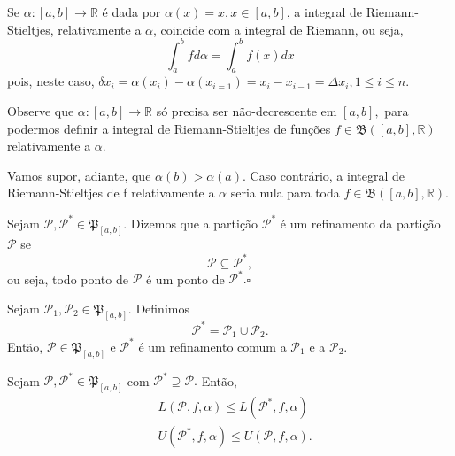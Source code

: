 \documentclass[Analysis/analysis_notes.tex]{subfiles}
\begin{document}
 Se \(\alpha :[a, b]\rightarrow \mathbb{R}\) é dada por \(\alpha (x) = x, x\in[a, b]\), a integral de Riemann-Stieltjes, relativamente a \(\alpha \), coincide
com a integral de Riemann, ou seja, 
  \[
    \int_{a}^{b}f d\alpha = \int_{a}^{b}f(x)dx
  \]
  pois, neste caso, \(\delta x_{i}=\alpha (x_{i}) - \alpha (x_{i=1}) = x_{i} - x_{i-1} = \Delta x_{i}, 1\leq i\leq n\).

  Observe que \(\alpha :[a, b]\rightarrow \mathbb{R}\) só precisa ser não-decrescente em \([a, b],\) para
  podermos definir a integral de Riemann-Stieltjes de fun\c cões \(f\in \mathfrak{B}([a, b], \mathbb{R})\) relativamente a \(\alpha .\)

  Vamos supor, adiante, que \(\alpha (b) > \alpha (a).\) Caso contrário, a integral de Riemann-Stieltjes de f 
  relativamente a \(\alpha \) seria nula para toda \(f\in \mathfrak{B}([a, b], \mathbb{R})\).
 \begin{def*}
   Sejam \(\mathcal{P}, \mathcal{P}^{*}\in \mathfrak{P}_{[a, b]}\). Dizemos que a parti\c cão \(\mathcal{P}^{*}\) é um
   refinamento da parti\c cão \(\mathcal{P}\) se 
     \[
       \mathcal{P}\subseteq{\mathcal{P}^{*},}
     \]
     ou seja, todo ponto de \(\mathcal{P}\) é um ponto de \(\mathcal{P}^{*}. \square\) 
 \end{def*}
 Sejam \(\mathcal{P}_{1}, \mathcal{P}_{2}\in \mathfrak{P}_{[a, b]}.\) Definimos 
   \[
     \mathcal{P}^{*} = \mathcal{P}_{1}\cup \mathcal{P}_{2}.
   \]
   Então, \(\mathcal{P}\in \mathfrak{P}_{[a, b]}\) e \(\mathcal{P}^{*}\) é um refinamento comum
   a \(\mathcal{P}_{1}\) e a \(\mathcal{P}_{2}.\)
  \begin{prop*}
    Sejam \(\mathcal{P}, \mathcal{P}^{*}\in \mathfrak{P}_{[a, b]}\) com \(\mathcal{P}^{*}\supseteq{\mathcal{P}.}\) Então, 
   \begin{align*}
     &L(\mathcal{P}, f, \alpha )\leq L(\mathcal{P}^{*}, f, \alpha )\\
     &U(\mathcal{P}^{*}, f, \alpha )\leq U(\mathcal{P}, f, \alpha ).
   \end{align*}
  \end{prop*}
\end{document}
